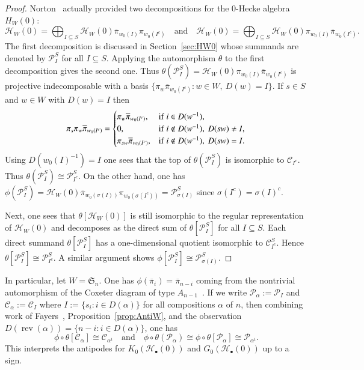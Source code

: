\documentclass{amsart}
\newtheorem*{Young's Rule}{Young's Rule}
\theoremstyle{definition}
\theoremstyle{remark}
\numberwithin{equation}{section}
\begin{document}
\begin{proof}
Norton~\cite{Norton} actually provided two decompositions for the 0-Hecke algebra $H_W(0)$:
\[
{\mathcal{H}}_W(0) = \bigoplus_{I\subseteq S}  {\mathcal{H}}_W(0) {\overline{\pi}}_{w_0(I)}\pi_{w_0(I^c)}
{\quad\text{and}\quad} 
{\mathcal{H}}_W(0) = \bigoplus_{I\subseteq S} {\mathcal{H}}_W(0)\pi_{w_0(I)}{\overline{\pi}}_{w_0(I^c)}.
\]
The first decomposition is discussed in Section~\ref{sec:HW0} whose summands are denoted by ${\mathcal{P}}_I^S$ for all $I\subseteq S$. Applying the automorphism $\theta$ to the first decomposition gives the second one. Thus $\theta({\mathcal{P}}_I^S) = {\mathcal{H}}_W(0)\pi_{w_0(I)}{\overline{\pi}}_{w_0(I^c)}$ is projective indecomposable with a basis $\{\pi_w{\overline{\pi}}_{w_0(I^c)}: w\in W,\ D(w)=I\}$. If $s\in S$ and $w\in W$ with  $D(w)=I$ then 
\[
\pi_s \pi_{w}{\overline{\pi}}_{w_0(I^c)}=
\begin{cases}
\pi_{w}{\overline{\pi}}_{w_0(I^c)}, & {\rm if}\ i\in D(w^{-1}), \\
0, & {\rm if}\ i\notin D(w^{-1}),\ D(sw)\ne I, \\
\pi_{sw}{\overline{\pi}}_{w_0(I^c)}, & {\rm if}\  i\notin D(w^{-1}),\ D(sw)=I.
\end{cases}
\]
Using $D(w_0(I)^{-1})=I$ one sees that the top of $\theta({\mathcal{P}}_I^S)$ is isomorphic to ${\mathcal{C}}_{I^c}$. Thus $\theta({\mathcal{P}}_I^S)\cong {\mathcal{P}}_{I^c}^S$. On the other hand, one has $\phi({\mathcal{P}}_I^S)={\mathcal{H}}_W(0) {\overline{\pi}}_{w_0(\sigma(I))}\pi_{w_0(\sigma(I^c))} = {\mathcal{P}}_{\sigma(I)}^S$ since $\sigma(I^c)=\sigma(I)^c$.

Next, one sees that $\theta[{\mathcal{H}}_W(0)]$ is still isomorphic to the regular representation of ${\mathcal{H}}_W(0)$ and decomposes as the direct sum of $\theta[{\mathcal{P}}_I^S]$ for all $I\subseteq S$. Each direct summand $\theta[{\mathcal{P}}_I^S]$ has a one-dimensional quotient isomorphic to ${\mathcal{C}}_{I^c}^S$. Hence $\theta[{\mathcal{P}}_I^S]\cong {\mathcal{P}}_{I^c}^S$. A similar argument shows $\phi[{\mathcal{P}}_I^S] \cong {\mathcal{P}}_{\sigma(I)}^S$.
\end{proof}

In particular, let $W={{\mathfrak S}}_n$. One has $\phi({\overline{\pi}}_i)={\overline{\pi}}_{n-i}$ coming from the nontrivial automorphism of the Coxeter diagram of type $A_{n-1}$~\cite[Proposition 2.4]{Fayers}. 
If we write ${\mathcal{P}}_\alpha:={\mathcal{P}}_I$ and ${\mathcal{C}}_\alpha:={\mathcal{C}}_I$ where $I:=\{s_i: i\in D(\alpha)\}$ for all compositions $\alpha$ of $n$, then combining work of Fayers~\cite{Fayers}, Proposition~\ref{prop:AntiW}, and the observation $D({\operatorname{rev}}(\alpha)) = \{ n-i: i\in D(\alpha)\}$, one has
\[ 
\phi\circ\theta[{\mathcal{C}}_\alpha]\cong {\mathcal{C}}_{\alpha^t} {\quad\text{and}\quad} 
\phi\circ \theta({\mathcal{P}}_\alpha) \cong \phi\circ\theta[{\mathcal{P}}_\alpha] \cong {\mathcal{P}}_{\alpha^t}.
\]
This interprets the antipodes for $K_0({\mathcal{H}}_\bullet(0))$ and $G_0({\mathcal{H}}_\bullet(0))$ up to a sign. 
\end{document}
